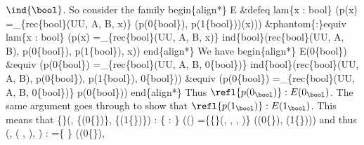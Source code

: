 $\ind{\bool}$.  So consider the family
begin\{align*\}
  E \&defeq 
  lam\{x : bool\} 
  (p(x) =\_\{rec\{bool\}(UU, A, B, x)\} (p(0\{bool\}), p(1\{bool\}))(x)))
  \&phantom\{:\}equiv
  lam\{x : bool\} 
  (p(x) =\_\{rec\{bool\}(UU, A, B, x)\} ind\{bool\}(rec\{bool\}(UU, A, B),
  p(0\{bool\}), p(1\{bool\}), x))
end\{align*\}
We have
begin\{align*\}
  E(0\{bool\})
  \&equiv
  (p(0\{bool\}) =\_\{rec\{bool\}(UU, A, B, 0\{bool\})\} ind\{bool\}(rec\{bool\}(UU, A, B),
  p(0\{bool\}), p(1\{bool\}), 0\{bool\}))
  \&equiv
  (p(0\{bool\}) =\_\{rec\{bool\}(UU, A, B, 0\{bool\})\} p(0\{bool\}))
end\{align*\}
Thus $\refl{p(0_{\bool})} : E(0_{\bool})$.  The same argument goes through to
show that $\refl{p(1_{\bool})} : E(1_{\bool})$.  This means that
   
  \{\}(, \{(0\coqdocvar{\_}\{\})\}, \{(1\coqdocvar{\_}\{\})\})
  :
  \{ : \} (() =\coqdocvar{\_}\{\{\}(, , , )\} ((0\coqdocvar{\_}\{\}),
  (1\coqdocvar{\_}\{\})))
and thus
  (, ( ,  ), ) 
  :  =\coqdocvar{\_}\{  \} ((0\coqdocvar{\_}\{\}),
